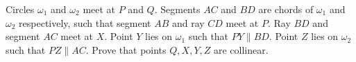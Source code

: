 Circles $ \omega_1$ and $ \omega_2$ meet at $ P$ and $ Q$. Segments $ AC$ and $ BD$ are chords of $ \omega_1$ and $ \omega_2$ respectively, such that segment $ AB$ and ray $ CD$ meet at $ P$. Ray $ BD$ and segment $ AC$ meet at $ X$. Point $ Y$ lies on $ \omega_1$ such that $ PY \parallel BD$. Point $ Z$ lies on $ \omega_2$ such that $ PZ \parallel AC$. Prove that points $ Q,X,Y,Z$ are collinear.